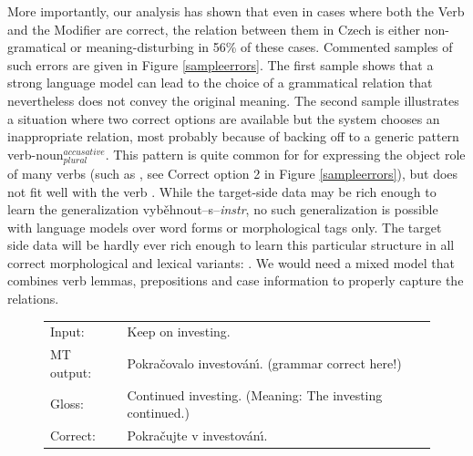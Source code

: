 \documentclass[11pt]{report}
\theoremstyle{plain}
\begin{document}
{{More
importantly, our analysis has shown that even in cases where both the Verb and
the Modifier are correct, the relation between them in Czech is either
non-gramatical or meaning-disturbing in 56\% of these cases. Commented samples
of such errors are given in Figure \ref{sampleerrors}. The first sample shows
that a strong language model can lead to the choice of a grammatical relation
that nevertheless does not convey the original meaning. The second sample
illustrates a situation where two correct options are available but the
system chooses an inappropriate relation, most probably because of backing off to
a generic pattern verb-noun$_{plural}^{accusative}$. This pattern
is quite common for
for expressing the object role of
many verbs (such as , see Correct
option 2 in Figure \ref{sampleerrors}), but does not fit well with the verb
. While the target-side data
may be rich enough to learn the generalization vyb\v{e}hnout--s--{\it instr},
no
such generalization is possible with language models over word forms or
morphological tags only. The
target side data will be hardly ever rich enough to learn this particular
structure in all correct morphological and lexical variants:
. We would need a 
mixed
model that combines verb lemmas, prepositions and case information to properly
capture the relations.


\begin{figure}

\begin{center}
{\small
\begin{tabular}{|ll|}
\hline
Input:      &  {Keep on investing.}\\
MT output:  &  Pokra\v{c}ovalo investov\'{a}n\'{\i}. (grammar correct here!)\\
Gloss:      &  Continued investing. (Meaning: The investing continued.)\\
Correct:    &  {Pokra\v{c}ujte v investov\'{a}n\'{\i}.}\\
\hline
\end{tabular}
}
\end{center}



\end{figure}}}
\end{document}
